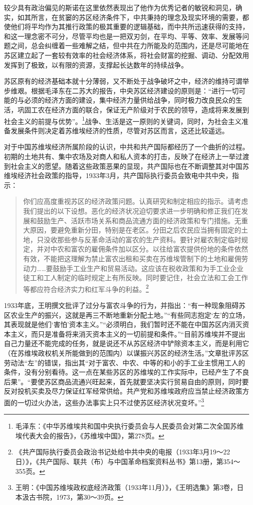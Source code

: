 较少具有政治偏见的斯诺在这里依然表现出了他作为优秀记者的敏锐和洞见，确实，如其所言，在贫窭的苏区经济条件下，中共秉持的理念及现实环境的需要，都使他们将平均作为其推行政策的极其重要的逻辑基础，而中共所迅速获得的支持，和这一理念密不可分，尽管平均也是一把双刃剑，在平均、平等、效率、发展等问题之间，总会纠缠着一些难解之结，但中共在力所能及的范围内，还是尽可能地在苏区建立起了一套较有效率的社会经济体系，将社会财富的挖掘、调动、分配效用发挥到了极致，以有限的资源，支撑起长达数年的持续战争。


苏区原有的经济基础本就十分薄弱，又不断处于战争破坏之中，经济的维持可谓举步维艰。根据毛泽东在二苏大的报告，中央苏区经济建设的原则是：“进行一切可能的与必须的经济方面的建设，集中经济力量供给战争，同时极力改良民众的生活，巩固工农在经济方面的联合，保证无产阶级对于农民的领导，造成将来发展到社会主义的前提与优势”。\footnote{毛泽东：《中华苏维埃共和国中央执行委员会与人民委员会对第二次全国苏维埃代表大会的报告》，《苏维埃中国》，第278页。}战争、生活是这一原则的关键词，同时，为社会主义准备发展条件则决定着苏维埃经济的性质，尽管对苏区而言，这还比较遥远。


对于中国苏维埃经济所属阶段的认识，中共和共产国际都经历了一个曲折的过程。初期的土地共有、集中农场及对商人和私人资本的打击，反映了在经济上一举过渡到社会主义的愿望。随着这些政策恶果的显现，共产国际也在不断调整其对中国苏维埃经济社会政策的指导，1933年3月，共产国际执行委员会致电中共中央，指示：

\begin{quote}

你们应高度重视苏区的经济政策问题。认真研究和制定相应的指示。请考虑我们提出的以下设想。恶化的经济状况迫切要求进一步明确和修正我们在发展和鼓励生产、活跃市场关系和商品流通方面的经济政策和专门措施。无重大原因，要避免重新分田，特别是在老区。分田之后农民应当拥有固定的土地，只没收那些参与反革命活动的富农的生产资料。要针对雇农制定临时规定，并对中农和富农的雇佣条件加以区分。以往给富农提供份地的条件依然有效，不能把这理解为禁止富农出租和买卖在苏维埃管制下的土地和雇佣劳动力……要鼓励手工业生产和贸易活动。这应该在税收政策和为手工业企业徒工和工人制定的临时规定上有所反映。同时要记住，社会立法和工会工作等都应符合经济实力和红军斗争的利益。\footnote{《共产国际执行委员会政治书记处给中共中央的电报（1933年3月19～22日）》，《共产国际、联共（布）与中国革命档案资料丛书》第13册，第354～355页。}
\end{quote}


1933年底，王明撰文批评了过分与富农斗争的行为，并指出：“有一种现象阻碍苏区农业生产的振兴，这就是再三不断地重新分配土地。”“有些同志抱定‘左’的立场，其表现就是他们‘害怕’资本主义。”“必须明白，我们暂时还不能在中国苏区内消灭资本主义，而只是准备将来消灭资本主义的一切前提和条件。”“目前苏维埃并不提出自己力量还不能完成的任务，就是说还不从苏区经济中铲除资本主义，而是利用它（在苏维埃政权机关所能做到的范围内）以谋振兴苏区的经济生活。”文章批评苏区劳动法“左”的错误，指出其“对于富农、中农、中等的和小的手工业主惯用工人的条件，没有分别看待。这一点在某些苏区的苏维埃的工作实际中，已经产生了不良后果”。“要使苏区商品流通兴旺起来，首先就要坚决实行贸易自由的原则，同时要反对投机买卖及尽力保证红军经常供给。共产党和苏维埃政府应当禁止经济政策方面的一切过火办法，这些办法事实上只不过使苏区经济状况变坏。”\footnote{王明：《中国苏维埃政权底经济政策（1933年11月）》，《王明选集》第3卷，日本汲古书院，1973，第30～39页。}


